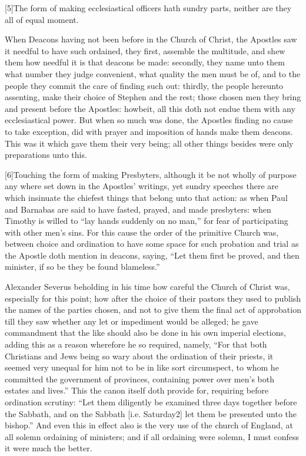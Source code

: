 [5]The form of making ecclesiastical officers hath sundry parts, neither are they all of equal moment.

When Deacons having not been before in the Church of  Christ, the Apostles saw it needful to have such ordained, they first, assemble the multitude, and shew them how needful it is that deacons be made: secondly, they name unto them what number they judge convenient, what quality the men must be of, and to the people they commit the care of finding such out: thirdly, the people hereunto assenting, make their choice of Stephen and the rest; those chosen men they bring and present before the Apostles: howbeit, all this doth not endue them with any ecclesiastical power. But when so much was done, the Apostles finding no cause to take exception, did with prayer and imposition of hands make them deacons. This was it which gave them their very being; all other things besides were only preparations unto this.

[6]Touching the form of making Presbyters, although it be not wholly of purpose any where set down in the Apostles’ writings, yet sundry speeches there are which insinuate the chiefest things that belong unto that action: as when Paul and Barnabas are said to have fasted, prayed, and made presbyters: when Timothy is willed to “lay hands suddenly on no man,” for fear of participating with other men’s sins. For this cause the order of the primitive Church was, between choice and ordination to have some space for such probation and trial as the Apostle doth mention in deacons, saying, “Let them first be proved, and then minister, if so be they be found blameless.”

Alexander Severus beholding in his time how careful the Church of Christ was, especially for this point; how after the choice of their pastors they used to publish the names of the parties chosen, and not to give them the final act of approbation till they saw whether any let or impediment would be alleged; he gave commandment that the like should also be done in his own imperial elections, adding this as a reason  wherefore he so required, namely, “For that both Christians and Jews being so wary about the ordination of their priests, it seemed very unequal for him not to be in like sort circumspect, to whom he committed the government of provinces, containing power over men’s both estates and lives.” This the canon itself doth provide for, requiring before ordination scrutiny: “Let them diligently be examined three days together before the Sabbath, and on the Sabbath [i.e. Saturday2] let them be presented unto the bishop.” And even this in effect also is the very use of the church of England, at all solemn ordaining of ministers; and if all ordaining were solemn, I must confess it were much the better.

